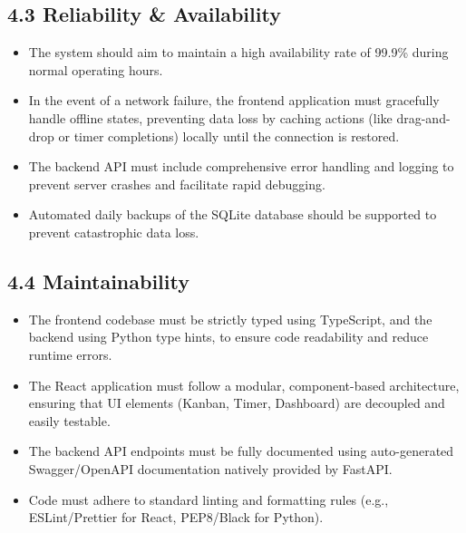\documentclass[12pt]{article}
\begin{document}
\vspace{0.5cm}
\subsection*{4.3 Reliability \& Availability}
\begin{itemize}
    \item The system should aim to maintain a high availability rate of 99.9\% during normal operating hours.
    \item In the event of a network failure, the frontend application must gracefully handle offline states, preventing data loss by caching actions (like drag-and-drop or timer completions) locally until the connection is restored.
    \item The backend API must include comprehensive error handling and logging to prevent server crashes and facilitate rapid debugging.
    \item Automated daily backups of the SQLite database should be supported to prevent catastrophic data loss.
\end{itemize}

\vspace{0.5cm}
\subsection*{4.4 Maintainability}
\begin{itemize}
    \item The frontend codebase must be strictly typed using TypeScript, and the backend using Python type hints, to ensure code readability and reduce runtime errors.
    \item The React application must follow a modular, component-based architecture, ensuring that UI elements (Kanban, Timer, Dashboard) are decoupled and easily testable.
    \item The backend API endpoints must be fully documented using auto-generated Swagger/OpenAPI documentation natively provided by FastAPI.
    \item Code must adhere to standard linting and formatting rules (e.g., ESLint/Prettier for React, PEP8/Black for Python).
\end{itemize}

\vspace{0.5cm}
\end{document}
